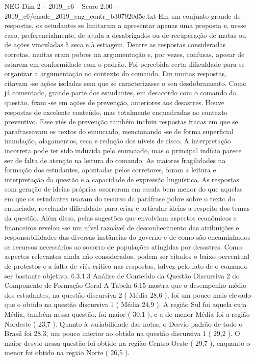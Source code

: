 \begin{textsample}{NEG Dim 2 – 2019\_c6 – Score 2.00 – 2019\_c6/enade\_2019\_eng\_contr\_b307920d5e.txt}
Em um conjunto grande de respostas, os estudantes se limitaram a apresentar apenas uma proposta e, nesse caso, preferencialmente, de ajuda a desabrigados ou de recuperação de matas ou de ações vinculadas à seca e à estiagem.
Dentre as respostas consideradas corretas, muitas eram pobres na argumentação e, por vezes, confusas, apesar de estarem em conformidade com o padrão.
Foi percebida certa dificuldade para se organizar a argumentação no contexto do comando.
Em muitas respostas, citavam -se ações isoladas sem que se caracterizasse o seu desdobramento.
Como já comentado, grande parte dos estudantes, em desacordo com o comando da questão, fixou -se em ações de prevenção, anteriores aos desastres.
Houve respostas de excelente conteúdo, mas totalmente enquadradas no contexto preventivo.
Esse viés de prevenção também incluiu respostas fracas em que se parafraseavam os textos do enunciado, mencionando -se de forma superficial inundação, alagamentos, seca e redução dos níveis de risco.
A interpretação incorreta pode ter sido induzida pelo enunciado, mas o principal indício parece ser de falta de atenção na leitura do comando.
As maiores fragilidades na formação dos estudantes, apontadas pelos corretores, foram a leitura e interpretação da questão e a capacidade de expressão linguística.
As respostas com geração de ideias próprias ocorreram em escala bem menor do que aquelas em que os estudantes usaram do recurso da paráfrase pobre sobre o texto do enunciado, revelando dificuldade para criar e articular ideias a respeito dos temas da questão.
Além disso, pelas sugestões que envolviam aspectos econômicos e financeiros revelou -se um nível razoável de desconhecimento das atribuições e responsabilidades das diversas instâncias do governo e de como são encaminhados os recursos necessários ao socorro de populações atingidas por desastres.
Como aspectos relevantes ainda não considerados, podem ser citados o baixo percentual de protestos e a falta de viés crítico nas respostas, talvez pelo fato de o comando ser bastante objetivo. 6.3.1.3 Análise de Conteúdo da Questão Discursiva 2 do Componente de Formação Geral A Tabela 6.15 mostra que o desempenho médio dos estudantes, na questão discursiva 2 ( Média 28,6 ), foi um pouco mais elevado que o obtido na questão discursiva 1 ( Média 24,9 ).
A região Sul foi aquela cuja Média, também nessa questão, foi maior ( 30,1 ), e a de menor Média foi a região Nordeste ( 23,7 ).
Quanto à variabilidade das notas, o Desvio padrão de todo o Brasil foi 28,3, um pouco inferior ao obtido na questão discursiva 1 ( 29,2 ).
O maior desvio nessa questão foi obtido na região Centro-Oeste ( 29,7 ), enquanto o menor foi obtido na região Norte ( 26,5 ).

\end{textsample}
